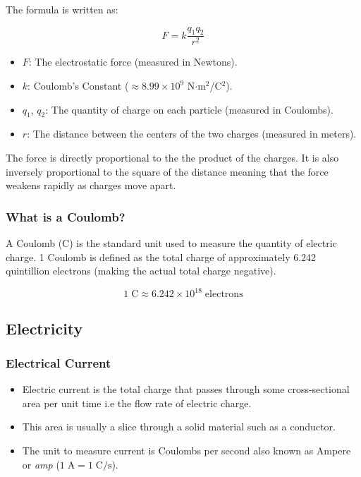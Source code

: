 \documentclass{article}
\begin{document}
The formula is written as:

$$F = k\frac{q_1q_2}{r^2}$$

\begin{itemize}
    \item $F$: The electrostatic force (measured in Newtons).
    \item $k$: Coulomb's Constant ($\approx 8.99 \times 10^9 $ N$\cdot$m$^2$/C$^2$).
    \item $q_1$, $q_2$: The quantity of charge on each particle (measured in Coulombs).
    \item $r$: The distance between the centers of the two charges (measured in meters).
\end{itemize}

The force is directly proportional to the the product of the charges. It is also inversely proportional to the square of the distance meaning that the force weakens rapidly as charges move apart.

\subsubsection{What is a Coulomb?}

A Coulomb (C) is the standard unit used to measure the quantity of electric charge. 1 Coulomb is defined as the total charge of approximately 6.242 quintillion electrons (making the actual total charge negative).

$$1 \; \mathrm{C} \approx 6.242 \times 10^{18} \; \mathrm{electrons}$$

\subsection{Electricity}

\subsubsection{Electrical Current}

\begin{itemize}
    \item Electric current is the total charge that passes through some cross-sectional area per unit time i.e the flow rate of electric charge.
    \item This area is usually a slice through a solid material such as a conductor.
    \item The unit to measure current is Coulombs per second also known as Ampere or \emph{amp} ($1 \; \mathrm{A} = 1 \; \mathrm{C/s}$).
\end{itemize}
\end{document}
